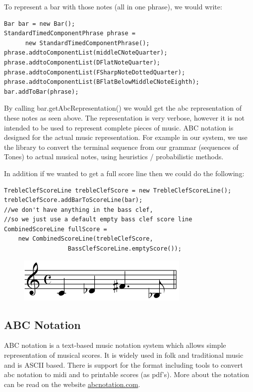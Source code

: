 \documentclass[pdftex,12pt,a4paper]{report}
\begin{document}
To represent a bar with those notes (all in one phrase), we would write:

\begin{lstlisting}
Bar bar = new Bar();
StandardTimedComponentPhrase phrase = 
      new StandardTimedComponentPhrase();
phrase.addtoComponentList(middleCNoteQuarter);
phrase.addtoComponentList(DFlatNoteQuarter);
phrase.addtoComponentList(FSharpNoteDottedQuarter);
phrase.addtoComponentList(BFlatBelowMiddleCNoteEighth);
bar.addToBar(phrase);

\end{lstlisting}

By calling bar.getAbcRepresentation() we would get the abc representation of these notes as seen above. The representation is very verbose, however it is not intended to be used to represent complete pieces of music. ABC notation is designed for the actual music representation. For example in our system, we use the library to convert the terminal sequence from our grammar (sequences of Tones) to actual musical notes, using heuristics / probabilistic methods. 

In addition if we wanted to get a full score line then we could do the following:

\begin{lstlisting}
TrebleClefScoreLine trebleClefScore = new TrebleClefScoreLine();
trebleClefScore.addBarToScoreLine(bar);
//we don't have anything in the bass clef, 
//so we just use a default empty bass clef score line
CombinedScoreLine fullScore = 
	new CombinedScoreLine(trebleClefScore, 
			      BassClefScoreLine.emptyScore());

\end{lstlisting}

\begin{figure}[here]
  \centering
  \includegraphics[scale=0.6]{figure/abcnotationexample.png}
  \label{fig:abcnotationexample}
\end{figure}

\subsection{ABC Notation}
ABC notation is a text-based music notation system which allows simple representation of musical scores. It is widely used in folk and traditional music and is ASCII based. There is support for the format including tools to convert abc notation to midi and to printable scores (as pdf's). More about the notation can be read on the website \url{abcnotation.com}.
\end{document}
